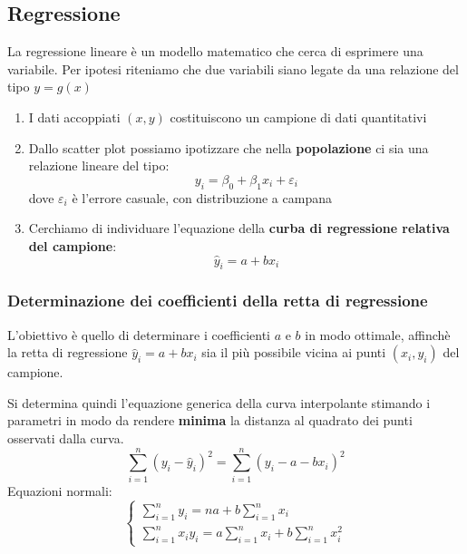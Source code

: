 \documentclass[a4paper]{article}
\theoremstyle{break}
\theoremstyle{break}
\theoremstyle{break}
\theoremstyle{break}
\begin{document}
\subsection{Regressione}
La regressione lineare è un modello matematico che cerca di esprimere una variabile.
Per ipotesi riteniamo che due variabili siano legate da una relazione del tipo \( y = g(x) \)
\begin{enumerate}
	\item I dati accoppiati \( (x,y) \) costituiscono un campione di dati quantitativi
	\item Dallo scatter plot possiamo ipotizzare che nella \textbf{popolazione} ci sia una
	      relazione lineare del tipo:
	      \[
		      y_i = \beta_0 + \beta_1 x_i + \varepsilon_i
	      \]
	      dove \( \varepsilon_i \) è l'errore casuale, con distribuzione a campana
	      \begin{figure}[H]
		      \centering
	      \end{figure}
	\item Cerchiamo di individuare l'equazione della \textbf{curba di regressione relativa
		      del campione}:
	      \[
		      \hat{y}_i = a + bx_i
	      \]
\end{enumerate}

\subsubsection{Determinazione dei coefficienti della retta di regressione}
L'obiettivo è quello di determinare i coefficienti \( a \) e \( b \) in modo ottimale,
affinchè la retta di regressione \( \hat{y}_i = a + bx_i \) sia il più possibile vicina
ai punti \( (x_i, y_i) \) del campione.

Si determina quindi l'equazione generica della curva interpolante stimando i parametri in
modo da rendere \textbf{minima} la distanza al quadrato dei punti osservati dalla curva.
\[
  \sum_{i=1}^{n} (y_i - \hat{y}_i)^2 = \sum_{i=1}^{n} (y_i - a - bx_i)^2
\] 
Equazioni normali:
\[
  \begin{cases}
    \sum_{i=1}^{n} y_i = na + b \sum_{i=1}^{n} x_i \\
    \sum_{i=1}^{n} x_i y_i = a \sum_{i=1}^{n} x_i + b \sum_{i=1}^{n} x_i^2
  \end{cases}
\]
\end{document}
